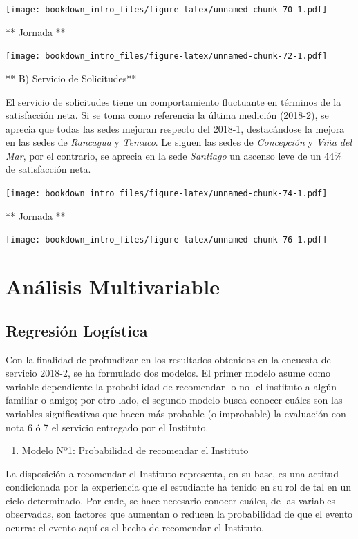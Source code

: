 \documentclass[]{book}
\providecommand{\tightlist}{%
  \setlength{\itemsep}{0pt}\setlength{\parskip}{0pt}}
\begin{document}
\texttt{[image: bookdown\_intro\_files/figure-latex/unnamed-chunk-70-1.pdf]}

** Jornada **

\texttt{[image: bookdown\_intro\_files/figure-latex/unnamed-chunk-72-1.pdf]}

** B) Servicio de Solicitudes**

El servicio de solicitudes tiene un comportamiento fluctuante en
términos de la satisfacción neta. Si se toma como referencia la última
medición (2018-2), se aprecia que todas las sedes mejoran respecto del
2018-1, destacándose la mejora en las sedes de \emph{Rancagua} y
\emph{Temuco}. Le siguen las sedes de \emph{Concepción} y \emph{Viña del
Mar}, por el contrario, se aprecia en la sede \emph{Santiago} un ascenso
leve de un 44\% de satisfacción neta.

\texttt{[image: bookdown\_intro\_files/figure-latex/unnamed-chunk-74-1.pdf]}

** Jornada **

\texttt{[image: bookdown\_intro\_files/figure-latex/unnamed-chunk-76-1.pdf]}

\chapter{Análisis Multivariable}\label{analisis-multivariable}

\section{Regresión Logística}\label{regresion-logistica}

Con la finalidad de profundizar en los resultados obtenidos en la
encuesta de servicio 2018-2, se ha formulado dos modelos. El primer
modelo asume como variable dependiente la probabilidad de recomendar -o
no- el instituto a algún familiar o amigo; por otro lado, el segundo
modelo busca conocer cuáles son las variables significativas que hacen
más probable (o improbable) la evaluación con nota 6 ó 7 el servicio
entregado por el Instituto.

\begin{enumerate}
\def\labelenumi{\alph{enumi})}
\tightlist
\item
  Modelo Nº1: Probabilidad de recomendar el Instituto
\end{enumerate}

La disposición a recomendar el Instituto representa, en su base, es una
actitud condicionada por la experiencia que el estudiante ha tenido en
su rol de tal en un ciclo determinado. Por ende, se hace necesario
conocer cuáles, de las variables observadas, son factores que aumentan o
reducen la probabilidad de que el evento ocurra: el evento aquí es el
hecho de recomendar el Instituto.
\end{document}
